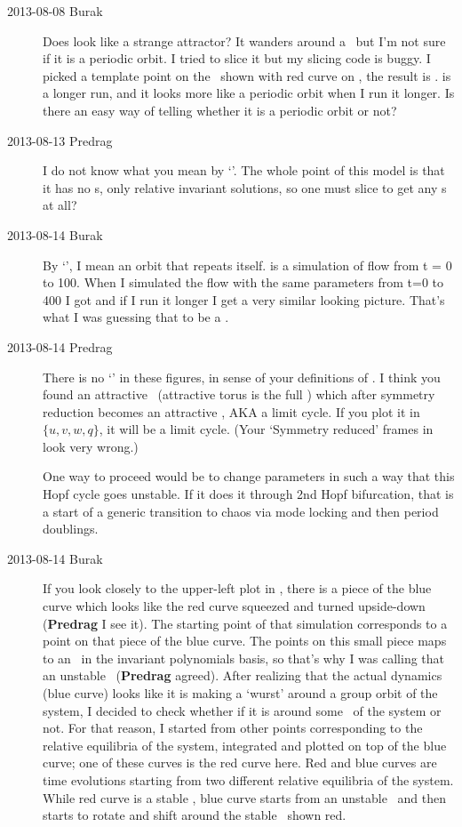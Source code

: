 \begin{description}
\item[2013-08-08  Burak] Does  look like a
strange attractor? It wanders around a \reqv\ but I'm not
sure if it is a periodic orbit. I tried to slice it but my slicing code
is buggy. I picked a template point on the \reqv\ shown
with red curve on , the result is
.  is a longer run,
and it looks more like a periodic orbit when I run it longer. Is there an
easy way of telling whether it is a periodic orbit or not?

\item[2013-08-13 Predrag]
I do not know what you mean by `\po'. The whole point of this model
is that it has no \po s, only relative invariant solutions, so one
must slice to get any \po s at all?

\item[2013-08-14 Burak] By `\po', I mean an orbit that repeats itself.
 is a simulation of \twoMode flow from t = 0 to
100. When I simulated the flow with the same parameters from t=0 to 400 I
got  and if I run it longer I get a very
similar looking picture. That's what I was guessing that to be a \po.

\item[2013-08-14 Predrag]
There is no `\po' in these figures, in sense of your definitions of
. I think you found an attractive \rpo\
(attractive torus is the full \statesp) which after symmetry reduction
becomes an attractive \po, AKA a limit cycle. If you plot it in
$\{u,v,w,q\}$, it will be a limit cycle. (Your `Symmetry reduced' frames
in \reffig{fig:BBpars3symmred} look very wrong.)

One way to proceed would be to
change parameters in such a way that this Hopf cycle goes unstable. If it
does it through 2nd Hopf bifurcation, that is a start of a generic
transition to chaos via mode locking and then period doublings.

\item[2013-08-14 Burak]
If you look closely to the upper-left plot in ,
there is a piece of the blue curve which looks like the red curve
squeezed and turned upside-down ({\bf Predrag} I see it). The starting
point of that simulation corresponds to a point on that piece of the blue
curve. The points on this small piece maps to an \eqv\ in the invariant
polynomials basis, so that's why I was calling that an unstable \reqv\
({\bf Predrag} agreed). After realizing that the actual dynamics (blue
curve) looks like it is making a `wurst' around a group orbit of the
system, I decided to check whether if it is around some \reqv\ of the
system or not. For that reason, I started from other points corresponding
to the relative equilibria of the system, integrated and plotted on top
of the blue curve; one of these curves is the red curve here. Red and
blue curves are time evolutions starting from two different relative
equilibria of the system. While red curve is a stable \reqv, blue curve
starts from an unstable \reqv\ and then starts to rotate and shift around
the stable \reqv\ shown red.


\end{description}
